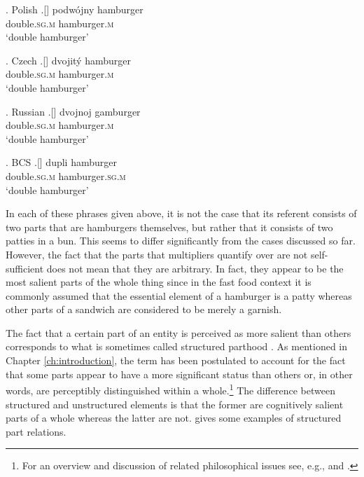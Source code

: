 \ex. Polish\label{ex:double-hamburger-polish}
\bg.[] podwójny hamburger\\
double\textsc{.sg.m} hamburger\textsc{.m}\\
`double hamburger'

\ex. Czech\label{ex:double-hamburger-czech}
\bg.[] dvojitý hamburger\\
double\textsc{.sg.m} hamburger\textsc{.m}\\
`double hamburger'

\ex. Russian\label{ex:double-hamburger-russian}
\bg.[] dvojnoj gamburger\\
double\textsc{.sg.m} hamburger\textsc{.m}\\
`double hamburger'

\ex. BCS\label{ex:double-hamburger-bcs}
\bg.[] dupli hamburger\\
double\textsc{.sg.m} hamburger\textsc{.sg.m}\\
`double hamburger'

In each of these phrases given above, it is not the case that its referent consists of two parts that are hamburgers themselves, but rather that it consists of two patties in a bun. This seems to differ significantly from the cases discussed so far. However, the fact that the parts that multipliers quantify over are not self-sufficient does not mean that they are arbitrary. In fact, they appear to be the most salient parts of the whole thing since in the fast food context it is commonly assumed that the essential element of a hamburger is a patty whereas other parts of a sandwich are considered to be merely a garnish.

The fact that a certain part of an entity is perceived as more salient than others corresponds to what is sometimes called structured parthood \citep{champollion_krifka2016mereology}. As mentioned in Chapter \ref{ch:introduction}, the term has been postulated to account for the fact that some parts appear to have a more significant status than others or, in other words, are perceptibly distinguished within a whole.\footnote{For an overview and discussion of related philosophical issues see, e.g., \citet{simons1987parts} and \citet{varzi2016mereology}.} The difference between structured and unstructured elements is that the former are cognitively salient parts of a whole whereas the latter are not.  gives some examples of structured part relations.

